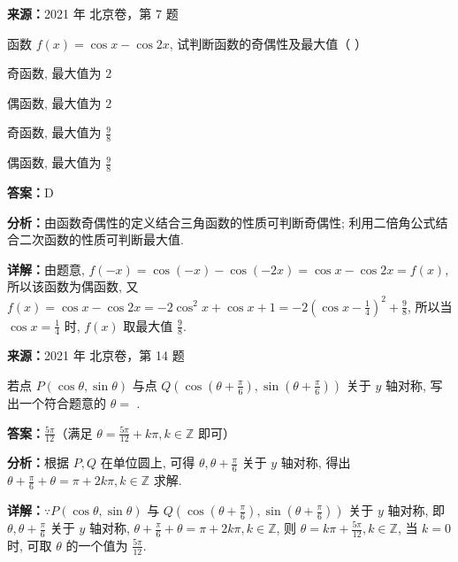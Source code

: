 \begin{question}[points=4]
\textbf{来源：}2021 年 北京卷，第 7 题\par
函数 $f(x)=\cos x-\cos 2x$, 试判断函数的奇偶性及最大值（ ）
\begin{choices}
  \item 奇函数, 最大值为 $2$
  \item 偶函数, 最大值为 $2$
  \item 奇函数, 最大值为 $\frac{9}{8}$
  \item 偶函数, 最大值为 $\frac{9}{8}$
\end{choices}
\begin{solution}
\textbf{答案：}D

\textbf{分析：}由函数奇偶性的定义结合三角函数的性质可判断奇偶性; 利用二倍角公式结合二次函数的性质可判断最大值.

\textbf{详解：}由题意, $f(-x)=\cos(-x)-\cos(-2x)=\cos x-\cos 2x=f(x)$, 所以该函数为偶函数, 又 $f(x)=\cos x-\cos 2x=-2\cos^2 x+\cos x+1=-2\left(\cos x-\frac{1}{4}\right)^2+\frac{9}{8}$, 所以当 $\cos x=\frac{1}{4}$ 时, $f(x)$ 取最大值 $\frac{9}{8}$.
\end{solution}
\end{question}

\begin{question}[points=5]
\textbf{来源：}2021 年 北京卷，第 14 题\par
若点 $P(\cos\theta,\sin\theta)$ 与点 $Q(\cos(\theta+\frac{\pi}{6}),\sin(\theta+\frac{\pi}{6}))$ 关于 $y$ 轴对称, 写出一个符合题意的 $\theta=$ .
\fillin[{$\frac{5\pi}{12}$（满足 $\theta=\frac{5\pi}{12}+k\pi, k\in\mathbb{Z}$ 即可）}]
\begin{solution}
\textbf{答案：}$\frac{5\pi}{12}$（满足 $\theta=\frac{5\pi}{12}+k\pi, k\in\mathbb{Z}$ 即可）

\textbf{分析：}根据 $P,Q$ 在单位圆上, 可得 $\theta,\theta+\frac{\pi}{6}$ 关于 $y$ 轴对称, 得出 $\theta+\frac{\pi}{6}+\theta=\pi+2k\pi, k\in\mathbb{Z}$ 求解.

\textbf{详解：}$\because P(\cos\theta,\sin\theta)$ 与 $Q(\cos(\theta+\frac{\pi}{6}),\sin(\theta+\frac{\pi}{6}))$ 关于 $y$ 轴对称, 即 $\theta,\theta+\frac{\pi}{6}$ 关于 $y$ 轴对称, $\theta+\frac{\pi}{6}+\theta=\pi+2k\pi, k\in\mathbb{Z}$, 则 $\theta=k\pi+\frac{5\pi}{12}, k\in\mathbb{Z}$, 当 $k=0$ 时, 可取 $\theta$ 的一个值为 $\frac{5\pi}{12}$.
\end{solution}
\end{question}

